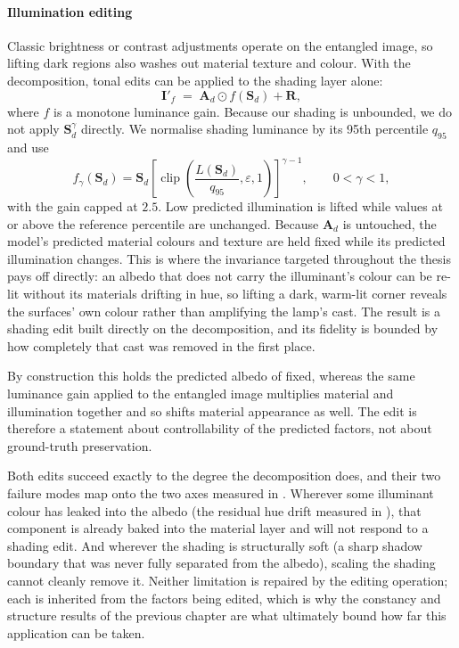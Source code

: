 \paragraph{Illumination editing}

Classic brightness or contrast adjustments operate on the entangled image, so
lifting dark regions also washes out material texture and colour.
With the decomposition, tonal edits can be applied to the shading layer alone:
\begin{equation}
  \mathbf{I}'_{f}
  \;=\;
  \mathbf{A}_d \odot f(\mathbf{S}_d) + \mathbf{R},
  \label{eq:illum_edit}
\end{equation}
where $f$ is a monotone luminance gain. Because our shading is unbounded, we do
not apply $\mathbf{S}_d^{\gamma}$ directly. We normalise shading luminance by its
95th percentile $q_{95}$ and use
\begin{equation}
 f_{\gamma}(\mathbf{S}_d)
 = \mathbf{S}_d
 \left[\operatorname{clip}\!\left(
 \frac{L(\mathbf{S}_d)}{q_{95}},\varepsilon,1\right)\right]^{\gamma-1},
 \qquad 0<\gamma<1 ,
 \label{eq:shadow_lift}
\end{equation}
with the gain capped at $2.5$. Low predicted illumination is lifted while values
at or above the reference percentile are unchanged.
Because $\mathbf{A}_d$ is untouched, the model's predicted material colours and
texture are held fixed while its predicted illumination changes.
This is where the invariance targeted throughout the thesis pays off directly: an
albedo that does not carry the illuminant's colour can be re-lit without its materials
drifting in hue, so lifting a dark, warm-lit corner reveals the surfaces' own colour
rather than amplifying the lamp's cast. The result is a shading edit built directly on
the decomposition, and its fidelity is bounded by how completely that cast was removed
in the first place.

By construction this holds the predicted albedo of  fixed,
whereas the same luminance gain applied to the entangled image multiplies material and
illumination together and so shifts material appearance as well. The edit is therefore a
statement about controllability of the predicted factors, not about ground-truth
preservation.

Both edits succeed exactly to the degree the decomposition does, and their two
failure modes map onto the two axes measured in . Wherever
some illuminant colour has leaked into the albedo (the residual hue drift measured in
), that component is already baked into the material
layer and will not respond to a shading edit. And wherever the shading is structurally
soft (a sharp shadow boundary that was never fully separated from the albedo), scaling
the shading cannot cleanly remove it. Neither limitation is repaired by the editing
operation; each is inherited from the factors being edited, which is why the constancy
and structure results of the previous chapter are what ultimately bound how far this
application can be taken.
